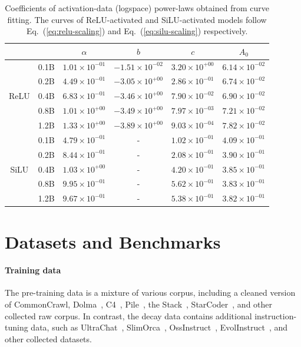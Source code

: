 \documentclass{article} %
\begin{document}
\begin{table}[ht]
\caption{Coefficients of activation-data (logspace) power-laws obtained from curve fitting. The curves of ReLU-activated and SiLU-activated models follow Eq.~(\ref{eq:relu-scaling}) and Eq.~(\ref{eq:silu-scaling}) respectively.}
\footnotesize
\label{table:curve-fit}
\begin{center}
\begin{tabular}{c|c|cccc}
\toprule
\multicolumn{2}{c}{} & $\alpha$ & $b$ & $c$ & $A_0$ \\

\midrule
\multirow{5}{*}{ReLU} & 0.1B  & $1.01\times 10^{-01}$  & $-1.51\times 10^{-02}$  & $3.20\times 10^{+00}$  & $6.14\times 10^{-02}$ \\
& 0.2B  & $4.49\times 10^{-01}$  & $-3.05\times 10^{+00}$  & $2.86\times 10^{-01}$  & $6.74\times 10^{-02}$ \\
& 0.4B   & $6.83\times 10^{-01}$  & $-3.46\times 10^{+00}$  & $7.90\times 10^{-02}$  & $6.90\times 10^{-02}$ \\
& 0.8B  & $1.01\times 10^{+00}$  & $-3.49\times 10^{+00}$  & $7.97\times 10^{-03}$  & $7.21\times 10^{-02}$ \\
& 1.2B  & $1.33\times 10^{+00}$  & $-3.89\times 10^{+00}$  & $9.03\times 10^{-04}$  & $7.82\times 10^{-02}$ \\

\midrule
\multirow{5}{*}{SiLU} & 0.1B  & $4.79\times 10^{-01}$ & -  & $1.02\times 10^{-01}$  & $4.09\times 10^{-01}$ \\
& 0.2B  & $8.44\times 10^{-01}$ & -  & $2.08\times 10^{-01}$  & $3.90\times 10^{-01}$ \\
& 0.4B  & $1.03\times 10^{+00}$ & -  & $4.20\times 10^{-01}$  & $3.85\times 10^{-01}$ \\
& 0.8B  & $9.95\times 10^{-01}$ & -  & $5.62\times 10^{-01}$  & $3.83\times 10^{-01}$ \\
& 1.2B & $9.67\times 10^{-01}$ & -  & $5.38\times 10^{-01}$  & $3.82\times 10^{-01}$ \\
\bottomrule
\end{tabular}
\end{center}
\end{table}

\section{Datasets and Benchmarks} \label{sec:data-benchmark}

\paragraph{Training data} The pre-training data is a mixture of various corpus, including a cleaned version of CommonCrawl, Dolma~\citep{soldaini2024dolma}, C4~\citep{raffel2020exploring}, Pile~\citep{gao2020pile}, the Stack~\citep{kocetkov2022stack}, StarCoder~\citep{li2023starcoder}, and other collected raw corpus. In contrast, the decay data contains additional instruction-tuning data, such as UltraChat~\citep{ding2023enhancing}, SlimOrca~\citep{colombo2024saullm}, OssInstruct~\citep{wei2024magicoder}, EvolInstruct~\citep{xu2023wizardlm}, and other collected datasets.
\end{document}
